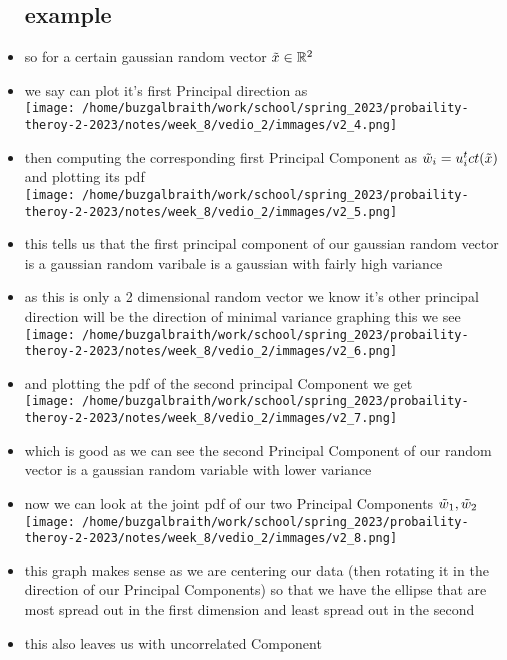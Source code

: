 \documentclass{article}
\begin{document}
\begin{itemize}
\subsection*{example}
\item so for a certain gaussian random vector $\Tilde{x}\in \mathbb{R}^{2}$
\item we say can plot it's first Principal direction as \\ \texttt{[image: /home/buzgalbraith/work/school/spring\_2023/probaility-theroy-2-2023/notes/week\_8/vedio\_2/immages/v2\_4.png]}
\item then computing the corresponding first Principal Component as $\Tilde{w}_i=u_i^{t}ct(\Tilde{x})$ and plotting its pdf    \\  \texttt{[image: /home/buzgalbraith/work/school/spring\_2023/probaility-theroy-2-2023/notes/week\_8/vedio\_2/immages/v2\_5.png]}
\item this tells us that the first principal component of our gaussian random vector is a gaussian random varibale is a gaussian with fairly high variance
\item as this is only a 2 dimensional random vector we know it's other principal direction will be the direction of minimal variance graphing this we see \\  \texttt{[image: /home/buzgalbraith/work/school/spring\_2023/probaility-theroy-2-2023/notes/week\_8/vedio\_2/immages/v2\_6.png]}
\item and plotting the pdf of the second principal Component we get \\ \texttt{[image: /home/buzgalbraith/work/school/spring\_2023/probaility-theroy-2-2023/notes/week\_8/vedio\_2/immages/v2\_7.png]} 
\item which is good as we can see the second Principal Component of our random vector is a gaussian random variable with lower variance
\item now we can look at the joint pdf of our two Principal Components $\Tilde{w}_1, \Tilde{w}_2$ \\  \texttt{[image: /home/buzgalbraith/work/school/spring\_2023/probaility-theroy-2-2023/notes/week\_8/vedio\_2/immages/v2\_8.png]}
\item this graph makes sense as we are centering our data (then rotating it in the direction of our Principal Components) so that we have the ellipse that are most spread out in the first dimension and least spread out in the second 
\item this also leaves us with uncorrelated Component

\end{itemize}
\end{document}
